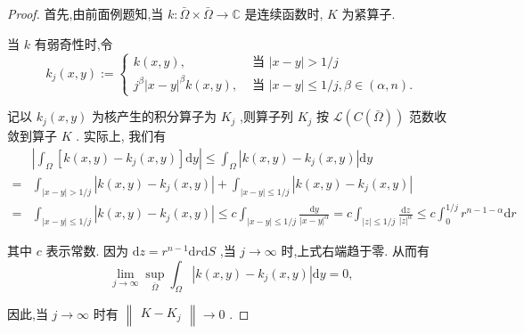 \documentclass[lang=cn,newtx,10pt,scheme=chinese,thmcnt=chapter]{elegantbook}
\newcommand{\dif}{\mathrm{d}}
\begin{document}
\begin{proof}
    首先,由前面例题知,当 \(k : \bar{\Omega } \times  \bar{\Omega } \rightarrow  \mathbb{C}\) 是连续函数时, \(K\) 为紧算子.

当 \(k\) 有弱奇性时,令
\begin{equation*}
{k}_{j}\left( {x,y}\right)  \mathrel{\text{ := }} \left\{  \begin{array}{ll} k\left( {x,y}\right) , & \text{ 当 }\left| {x - y}\right|  > 1/j \\  {j}^{\beta }{\left| x - y\right| }^{\beta }k\left( {x,y}\right) , & \text{ 当 }\left| {x - y}\right|  \leqslant  1/j,\beta  \in  \left( {\alpha ,n}\right) . \end{array}\right.
\end{equation*}

记以 \({k}_{j}\left( {x,y}\right)\) 为核产生的积分算子为 \({K}_{j}\) ,则算子列 \({K}_{j}\) 按 \(\mathcal{L}\left( {C\left( \bar{\Omega }\right) }\right)\) 范数收敛到算子 \(K\) . 实际上, 我们有
\begin{align*}
&\left| {{\int }_{\Omega }\left\lbrack  {k\left( {x,y}\right)  - {k}_{j}\left( {x,y}\right) }\right\rbrack  {\dif y}}\right|  \leqslant  {\int }_{\Omega }\left| {k\left( {x,y}\right)  - {k}_{j}\left( {x,y}\right) }\right| {\dif y}
\\=& {\int }_{\left| {x - y}\right|  > 1/j}\left| {k\left( {x,y}\right)  - {k}_{j}\left( {x,y}\right) }\right|  + {\int }_{\left| {x - y}\right|  \leqslant  1/j}\left| {k\left( {x,y}\right)  - {k}_{j}\left( {x,y}\right) }\right|\\= &{\int }_{\left| {x - y}\right|  \leqslant  1/j}\left| {k\left( {x,y}\right)  - {k}_{j}\left( {x,y}\right) }\right|\leqslant  c{\int }_{\left| {x - y}\right|  \leqslant  1/j}\frac{\dif y}{{\left| x - y\right| }^{\alpha }} = c{\int }_{\left| z\right|  \leqslant  1/j}\frac{\dif z}{{\left| z\right| }^{\alpha }}\leqslant  c{\int }_{0}^{1/j}{r}^{n - 1 - \alpha }{\dif r}
\end{align*}


其中 \(c\) 表示常数. 因为 \({\dif z} = {r}^{n - 1}{\dif r\dif S}\) ,当 \(j \rightarrow  \infty\) 时,上式右端趋于零. 从而有
\begin{equation*}
\mathop{\lim }\limits_{{j \rightarrow  \infty }}\mathop{\sup }\limits_{\bar{\Omega }}{\int }_{\Omega }\left| {k\left( {x,y}\right)  - {k}_{j}\left( {x,y}\right) }\right| {\dif y} = 0,
\end{equation*}

因此,当 \(j \rightarrow  \infty\) 时有 \(\begin{Vmatrix}{K - {K}_{j}}\end{Vmatrix} \rightarrow  0\) .
\end{proof}
\end{document}

